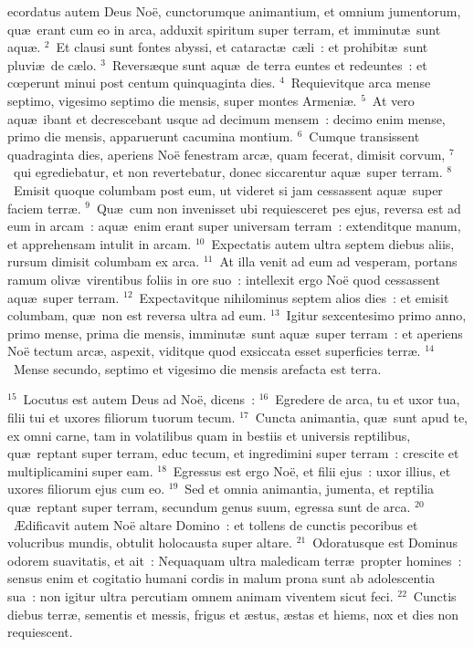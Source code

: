 \bchapter
{}ecordatus autem Deus No\"e, cunctorumque animantium, et omnium jumentorum, qu\ae\ erant cum eo in arca, adduxit spiritum super terram, et imminut\ae\ sunt aqu\ae .
${}^{2}$~Et clausi sunt fontes abyssi, et cataract\ae\ c\ae li~: et prohibit\ae\ sunt pluvi\ae\ de c\ae lo.
${}^{3}$~Revers\ae que sunt aqu\ae\ de terra euntes et redeuntes~: et cœperunt minui post centum quinquaginta dies.
${}^{4}$~Requievitque arca mense septimo, vigesimo septimo die mensis, super montes Armeni\ae .
${}^{5}$~At vero aqu\ae\ ibant et decrescebant usque ad decimum mensem~: decimo enim mense, primo die mensis, apparuerunt cacumina montium.
${}^{6}$~Cumque transissent quadraginta dies, aperiens No\"e fenestram arc\ae , quam fecerat, dimisit corvum,
${}^{7}$~qui egrediebatur, et non revertebatur, donec siccarentur aqu\ae\ super terram.
${}^{8}$~Emisit quoque columbam post eum, ut videret si jam cessassent aqu\ae\ super faciem terr\ae .
${}^{9}$~Qu\ae\ cum non invenisset ubi requiesceret pes ejus, reversa est ad eum in arcam~: aqu\ae\ enim erant super universam terram~: extenditque manum, et apprehensam intulit in arcam.
${}^{10}$~Expectatis autem ultra septem diebus aliis, rursum dimisit columbam ex arca.
${}^{11}$~At illa venit ad eum ad vesperam, portans ramum oliv\ae\ virentibus foliis in ore suo~: intellexit ergo No\"e quod cessassent aqu\ae\ super terram.
${}^{12}$~Expectavitque nihilominus septem alios dies~: et emisit columbam, qu\ae\ non est reversa ultra ad eum.
${}^{13}$~Igitur sexcentesimo primo anno, primo mense, prima die mensis, imminut\ae\ sunt aqu\ae\ super terram~: et aperiens No\"e tectum arc\ae , aspexit, viditque quod exsiccata esset superficies terr\ae .
${}^{14}$~Mense secundo, septimo et vigesimo die mensis arefacta est terra.


${}^{15}$~Locutus est autem Deus ad No\"e, dicens~:
${}^{16}$~Egredere de arca, tu et uxor tua, filii tui et uxores filiorum tuorum tecum.
${}^{17}$~Cuncta animantia, qu\ae\ sunt apud te, ex omni carne, tam in volatilibus quam in bestiis et universis reptilibus, qu\ae\ reptant super terram, educ tecum, et ingredimini super terram~: crescite et multiplicamini super eam.
${}^{18}$~Egressus est ergo No\"e, et filii ejus~: uxor illius, et uxores filiorum ejus cum eo.
${}^{19}$~Sed et omnia animantia, jumenta, et reptilia qu\ae\ reptant super terram, secundum genus suum, egressa sunt de arca.
${}^{20}$~\AE dificavit autem No\"e altare Domino~: et tollens de cunctis pecoribus et volucribus mundis, obtulit holocausta super altare.
${}^{21}$~Odoratusque est Dominus odorem suavitatis, et ait~: Nequaquam ultra maledicam terr\ae\ propter homines~: sensus enim et cogitatio humani cordis in malum prona sunt ab adolescentia sua~: non igitur ultra percutiam omnem animam viventem sicut feci.
${}^{22}$~Cunctis diebus terr\ae , sementis et messis, frigus et \ae stus, \ae stas et hiems, nox et dies non requiescent.

